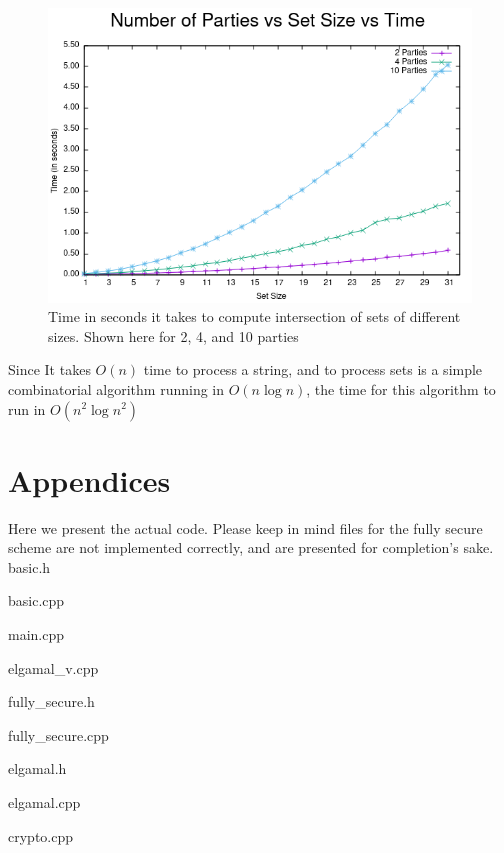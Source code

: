 \documentclass[10pt]{article}
\begin{document}
\begin{figure}[ht!]
\centering
\includegraphics[scale=0.64]{g6} 
\caption{Time in seconds it takes to compute intersection of sets of different sizes. Shown here for 2, 4, and 10 parties}
\end{figure}

Since It takes $O(n)$ time to process a string, and to process sets is a simple combinatorial algorithm running in $O(n\log n)$, the time for this algorithm to run in $O(n^2 \log n^2)$




\section{Appendices}
Here we present the actual code. Please keep in mind files for the fully secure scheme are not implemented correctly, and are presented for completion's sake.\\
basic.h

basic.cpp

main.cpp

elgamal\_v.cpp

fully\_secure.h

fully\_secure.cpp

elgamal.h

elgamal.cpp

crypto.cpp



\end{document}
